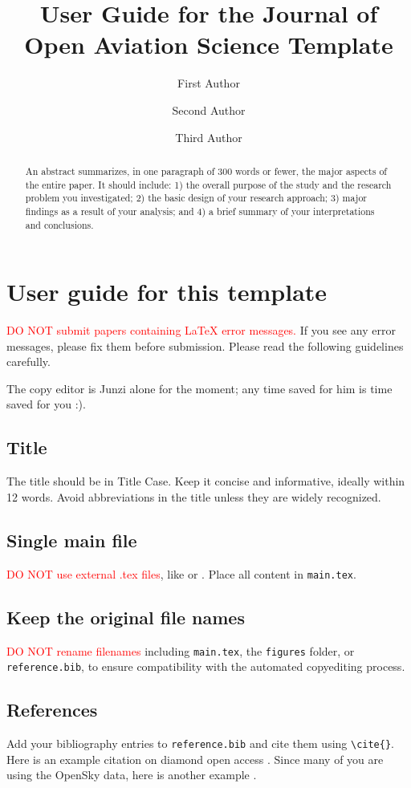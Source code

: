 \documentclass[
  manuscript=article,  %
  layout=preprint,  %
  year=20xx,
  volume=x,
]{extra/joas}
\title{User Guide for the Journal of Open Aviation Science Template}
\author{First Author \orcid{0000-0000-0000-0000}}
\affiliation{Institution-1, City, Country}
\author{Second Author \orcid{0000-0000-0000-0000}}
\affiliation{Institution-2, City, Country}
\author{Third Author}
\affiliation{Institution-3, City, Country}
\begin{document}
\begin{abstract}
  An abstract summarizes, in one paragraph of 300 words or fewer, the major aspects of the entire paper. It should include: 1) the overall purpose of the study and the research problem you investigated; 2) the basic design of your research approach; 3) major findings as a result of your analysis; and 4) a brief summary of your interpretations and conclusions. 
\end{abstract}



\section{User guide for this template}

\textcolor{red}{DO NOT submit papers containing LaTeX error messages.} If you see any error messages, please fix them before submission. Please read the following guidelines carefully.

The copy editor is Junzi alone for the moment; any time saved for him is time saved for you :).

\subsection{Title}
The title should be in Title Case. Keep it concise and informative, ideally within 12 words. Avoid abbreviations in the title unless they are widely recognized.

\subsection{Single main file}
\textcolor{red}{DO NOT use external .tex files}, like \verb|| or \verb||. Place all content in \texttt{main.tex}. 

\subsection{Keep the original file names}
\textcolor{red}{DO NOT rename filenames} including \texttt{main.tex}, the \texttt{figures} folder, or \texttt{reference.bib}, to ensure compatibility with the automated copyediting process.

\subsection{References}
Add your bibliography entries to \texttt{reference.bib} and cite them using \verb|\cite{}|. Here is an example citation on diamond open access \cite{fuchs2013diamond}. Since many of you are using the OpenSky data, here is another example \cite{schafer2014bringing}.
\end{document}
